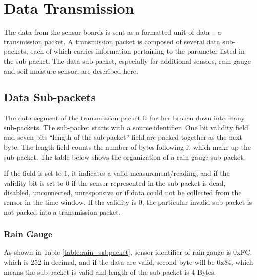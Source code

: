 \newpage

\section{Data Transmission} \label{section:overall}

The data from the sensor boards is sent as a formatted unit of data -- a transmission
packet. A transmission packet is composed of several data sub-packets, each
of which carries information pertaining to the parameter listed in the sub-packet.
The data sub-packet, especially for additional sensors, rain gauge and soil moisture sensor, are described here.

\subsection{Data Sub-packets} \label{ssec:sub-pack}

The data segment of the transmission packet is further broken down into many
sub-packets. The sub-packet starts with a source identifier. One bit
validity field and seven bits ``length of the sub-packet'' field
are packed together as the next byte. The length field counts the number of
bytes following it which make up the sub-packet. The table below shows the organization
of a rain gauge sub-packet. 
\par
If the field is set to 1, it indicates a valid measurement/reading, 
and if the validity bit is set to 0 if the sensor represented in the sub-packet
is dead, disabled, unconnected, unresponsive or if data could not be collected
from the sensor in the time window. If the validity is 0, the particular invalid sub-packet is not packed into a transmission packet.

\subsubsection{Rain Gauge}
As shown in Table \ref{table:rain_subpacket}, sensor identifier of rain gauge is 0xFC, which is 252 in decimal, and if the data are valid, second byte will be 0x84, which means the sub-packet is valid and length of the sub-packet is 4 Bytes.


\begin{table}[H]
    \caption{Sub-packet for rain gauge}
    \label{table:rain_subpacket}
\end{table}


